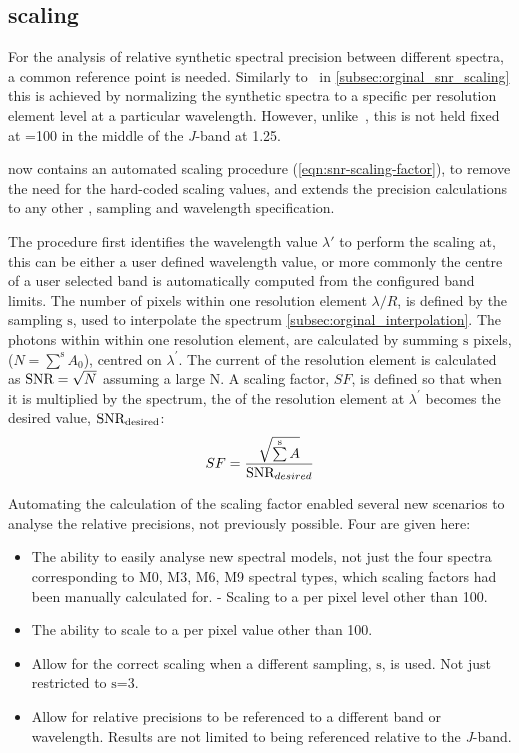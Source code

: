 \subsection{\snr{} scaling}
\label{subsec:snr_scaling}
For the analysis of relative synthetic spectral precision between different spectra, a common reference point is needed.
Similarly to~\citet{figueira_radial_2016} in \cref{subsec:orginal_snr_scaling} this is achieved by normalizing the synthetic spectra to a specific \snr{} per resolution element level at a particular wavelength.
However, unlike~\citet{figueira_radial_2016}, this is not held fixed at \snr{}=100 in the middle of the \emph{J}-band at 1.25\um{}.

\eniric{} now contains an automated \snr{} scaling procedure (\cref{eqn:snr-scaling-factor}), to remove the need for the hard-coded scaling values, and extends the precision calculations to any other \snr{}, sampling and wavelength specification.

The procedure first identifies the wavelength value \(\lambda\prime\) to perform the scaling at, this can be either a user defined wavelength value, or more commonly the centre of a user selected band is automatically computed from the configured band limits.
The number of pixels within one resolution element \(\lambda/R\), is defined by the sampling \(\mathrm{s}\), used to interpolate the spectrum \cref{subsec:orginal_interpolation}.
The photons within within one resolution element, are calculated by summing \(\mathrm{s}\) pixels, (\(N=\sum\limits^{\mathrm{s}}{{A}_{0}}\)), centred on \(\lambda^\prime\).
The current \snr{} of the resolution element is calculated as \(\textrm{SNR}{} = \sqrt{N}\) assuming a large N.
A scaling factor, \(SF\), is defined so that when it is multiplied by the spectrum, the \snr{} of the resolution element at \(\lambda^\prime\) becomes the desired value, \({\textrm{SNR}{}}_{\textrm{desired}}\):
\begin{equation}
SF =  \frac{\sqrt{\sum\limits^{\mathrm{s}} A}} {\textrm{SNR}{}_{desired}} \label{eqn:snr-scaling-factor}
\end{equation}

Automating the calculation of the scaling factor enabled several new scenarios to analyse the relative precisions, not previously possible. Four are given here:
\begin{itemize}
    \setlength\itemsep{-0.3em} %
    \item The ability to easily analyse new spectral models, not just the four spectra corresponding to {M0}, {M3}, {M6}, {M9} spectral types, which scaling factors had been manually calculated for.
    - Scaling to a \snr{} per pixel level other than 100.
    \item The ability to scale to a \snr{} per pixel value other than 100.
    \item Allow for the correct scaling when a different sampling, \(\mathrm{s}\), is used.
    Not just restricted to \(\mathrm{s}\)=3.
    \item Allow for relative precisions to be referenced to a different band or wavelength.
    Results are not limited to being referenced relative to the \textit{J}-band.
\end{itemize}

